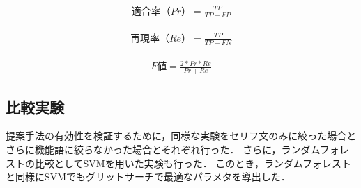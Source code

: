 \begin{eqnarray}
  適合率（Pr） = \frac{TP} {TP + FP}
\end{eqnarray}

\begin{eqnarray}
  再現率（Re） =  \frac{TP} {TP + FN}
\end{eqnarray}

\begin{eqnarray}
  F値 =  \frac{2*Pr*Re}{Pr + Re}
\end{eqnarray}


\subsection{比較実験}
提案手法の有効性を検証するために，同様な実験をセリフ文のみに絞った場合とさらに機能語に絞らなかった場合とそれぞれ行った．
さらに，ランダムフォレストの比較としてSVMを用いた実験も行った．
このとき，ランダムフォレストと同様にSVMでもグリットサーチで最適なパラメタを導出した．
